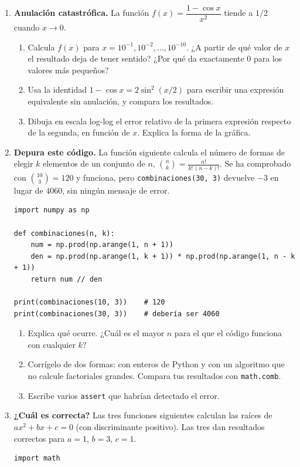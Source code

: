 \begin{enumerate}
\item \textbf{Anulación catastrófica.} La función $f(x)=\dfrac{1-\cos x}{x^2}$ tiende a $1/2$ cuando $x\to 0$.
\begin{enumerate}
\item Calcula $f(x)$ para $x=10^{-1},10^{-2},\ldots,10^{-10}$. ¿A partir de qué valor de $x$ el resultado deja de tener sentido? ¿Por qué da exactamente 0 para los valores más pequeños?
\item Usa la identidad $1-\cos x=2\sin^2(x/2)$ para escribir una expresión equivalente sin anulación, y compara los resultados.
\item Dibuja en escala log-log el error relativo de la primera expresión respecto de la segunda, en función de $x$. Explica la forma de la gráfica.
\end{enumerate}

\item \label{ej:comb} \textbf{Depura este código.} La función siguiente calcula el número de formas de elegir $k$ elementos de un conjunto de $n$, $\binom{n}{k}=\frac{n!}{k!\,(n-k)!}$. Se ha comprobado con $\binom{10}{3}=120$ y funciona, pero \texttt{combinaciones(30, 3)} devuelve $-3$ en lugar de $4060$, sin ningún mensaje de error.
\begin{verbatim}
import numpy as np

def combinaciones(n, k):
    num = np.prod(np.arange(1, n + 1))
    den = np.prod(np.arange(1, k + 1)) * np.prod(np.arange(1, n - k + 1))
    return num // den

print(combinaciones(10, 3))    # 120
print(combinaciones(30, 3))    # debería ser 4060
\end{verbatim}
\begin{enumerate}
\item Explica qué ocurre. ¿Cuál es el mayor $n$ para el que el código funciona con cualquier $k$?
\item Corrígelo de dos formas: con enteros de Python y con un algoritmo que no calcule factoriales grandes. Compara tus resultados con \texttt{math.comb}.
\item Escribe varios \texttt{assert} que habrían detectado el error.
\end{enumerate}

\item \textbf{¿Cuál es correcta?} Las tres funciones siguientes calculan las raíces de $ax^2+bx+c=0$ (con discriminante positivo). Las tres dan resultados correctos para $a=1$, $b=3$, $c=1$.
\begin{verbatim}
import math


\end{verbatim}
\end{enumerate}
